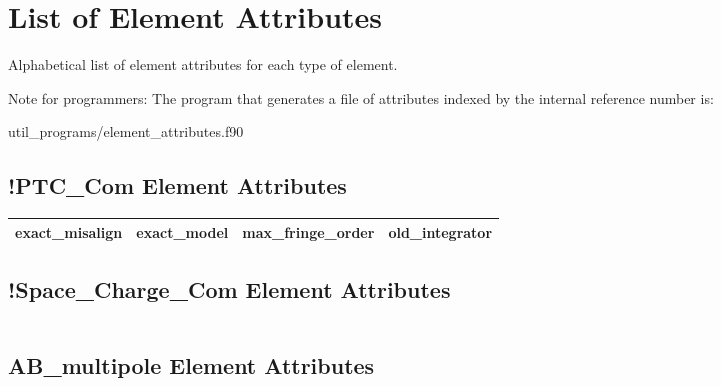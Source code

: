 \chapter{List of Element Attributes}
\label{c:attrib.list}

Alphabetical list of element attributes for each type of element. 

Note for programmers: The program that generates a file of attributes indexed by the
internal reference number is:
\begin{example}
  util_programs/element_attributes.f90 
\end{example}

 \section{!PTC_Com Element Attributes}
 \label{s:list.!ptc.com}
 
 \begin{tabular}{llll} \toprule
exact_misalign                   & exact_model                      & max_fringe_order                 & old_integrator                   \\
 \bottomrule
 \end{tabular}
 \vfill
 
 \section{!Space_Charge_Com Element Attributes}
 \label{s:list.!space.charge.com}
 
 \begin{tabular}{llll} \toprule
 \bottomrule
 \end{tabular}
 \vfill
 
 \section{AB_multipole Element Attributes}
 \label{s:list.ab.multipole}
 

